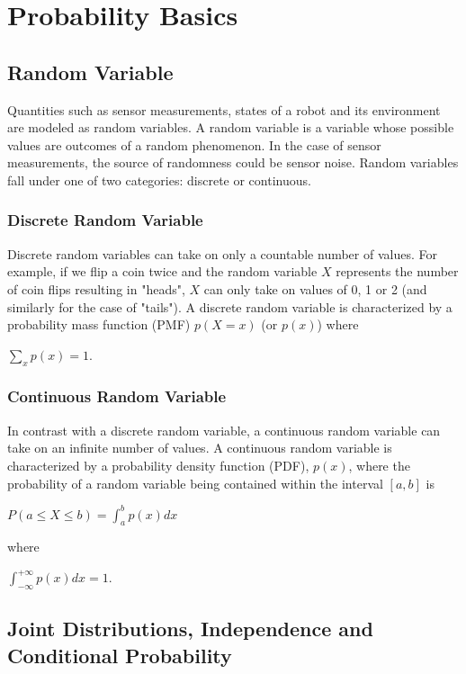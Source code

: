 \documentclass[twoside]{article}
\begin{document}
\section{Probability Basics}

\subsection{Random Variable}

Quantities such as sensor measurements, states of a robot and its environment are modeled as random variables. A random variable is a variable whose possible values are outcomes of a random phenomenon. In the case of sensor measurements, the source of randomness could be sensor noise. Random variables fall under one of two categories: discrete or continuous.

\subsubsection{Discrete Random Variable}

Discrete random variables can take on only a countable number of values. For example, if we flip a coin twice and the random variable $X$ represents the number of coin flips resulting in "heads", $X$ can only take on values of 0, 1 or 2 (and similarly for the case of "tails"). A discrete random variable is characterized by a probability mass function (PMF) $p(X=x)$ (or $p(x)$) where 
\begin{center}
$\sum\limits_{x} p(x)=1$.
\end{center}

\subsubsection{Continuous Random Variable}

In contrast with a discrete random variable, a continuous random variable can take on an infinite number of values. A continuous random variable is characterized by a probability density function (PDF), $p(x)$, where the probability of a random variable being contained within the interval $[a,b]$ is
\begin{center}
$P(a \leq X \leq b) = \int_{a}^{b}p(x)dx$
\end{center}
where
\begin{center}
$\int_{-\infty}^{+\infty}p(x)dx=1$.
\end{center}

\subsection{Joint Distributions, Independence and Conditional Probability}
\end{document}
